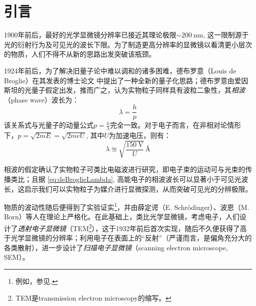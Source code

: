 \documentclass[aps,pre,12pt,preprint,%
	onecolumn,showpacs,showkeys,nofootinbib]{revtex4-1}
\begin{document}
\section{引言}
	\vspace{-2ex}
	1900年前后，最好的光学显微镜分辨率已接近其理论极限$\sim\SI{200}{\nm}$, 这一限制源于光的衍射行为及可见光的波长下限。为了制造更高分辨率的显微镜以看清更小层次的物质，人们不得不从新的思路出发突破该瓶颈。
	
	\setlength{\jot}{0pt}
	1924年前后，为了解决旧量子论中难以调和的诸多困难，德布罗意（Louis de Broglie）在其发表的博士论文 \cite{de1924recherches} 中提出了一种全新的量子化思路；德布罗意由爱因斯坦的光量子假定出发，推而广之，认为实物粒子同样具有波粒二象性，其\textit{相波}（phase wave）波长为：
	\begin{equation}
		\lambda = \frac{h}{p}
	\end{equation}
	该关系式与光量子的动量公式$p = \frac{h}{\lambda}$完全一致。对于电子而言，在非相对论情形下，$p = \sqrt{2mE} = \sqrt{2meU}$, 其中$U$为加速电压，则有：
	\begin{equation}
		\lambda \approxeq \sqrt{\frac{\SI{150}{\V}}{U}}\,\si{\angstrom}
		\label{eq:deBroglieLambda}
	\end{equation}
	
	相波的假定确认了实物粒子可类比电磁波进行研究，即电子束的运动可与光束的传播类比；且据 \eqref{eq:deBroglieLambda}, 高能电子的相波波长可以显著小于可见光波长，这启示我们可以实物粒子为媒介进行显微探测，从而突破可见光的分辨极限。
	
	物质的波动性随后便得到了实验证实\footnote{%
		例如，参见\cite{thomson1927diffraction}. 
	}，并由薛定谔（E. Schrödinger）、波恩（M. Born）等人在理论上严格化。在此基础上，类比光学显微镜，考虑电子，人们设计了\textit{透射电子显微镜}（TEM\footnote{%
		TEM是transmission electron microscopy的缩写。
	}），这于1932年前后首次实现，随后不久便获得了高于光学显微镜的分辨率\supercite{ruska1980early}；利用电子在表面上的“反射”（严谨而言，是偏角充分大的各类散射），进一步设计了\textit{扫描电子显微镜}（scanning electron microscope, SEM）。
	
\end{document}
